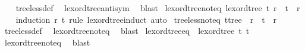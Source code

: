 \begin{isabellebody}
%
\isadelimproof
\ \ %
\endisadelimproof
%
\isatagproof
{}\isamarkupfalse%
\ tree{\isacharunderscore}{\kern0pt}less{\isacharunderscore}{\kern0pt}def\ \isamarkupfalse%
\ lexord{\isacharunderscore}{\kern0pt}tree{\isacharunderscore}{\kern0pt}antisym\ \isamarkupfalse%
\ blast%
\endisatagproof
{\isafoldproof}%
%
\isadelimproof
\isanewline
%
\endisadelimproof
\isanewline
{}\isamarkupfalse%
\ lexord{\isacharunderscore}{\kern0pt}tree{\isacharunderscore}{\kern0pt}not{\isacharunderscore}{\kern0pt}eq{\isacharcolon}{\kern0pt}\ {\isachardoublequoteopen}lexord{\isacharunderscore}{\kern0pt}tree\ t\ r\ {\isasymLongrightarrow}\ t\ {\isasymnoteq}\ r{\isachardoublequoteclose}\isanewline
%
\isadelimproof
\ \ %
\endisadelimproof
%
\isatagproof
{}\isamarkupfalse%
\ {\isacharparenleft}{\kern0pt}induction\ r\ t\ rule{\isacharcolon}{\kern0pt}\ lexord{\isacharunderscore}{\kern0pt}tree{\isachardot}{\kern0pt}induct{\isacharparenright}{\kern0pt}\ auto%
\endisatagproof
{\isafoldproof}%
%
\isadelimproof
\isanewline
%
\endisadelimproof
\isanewline
{}\isamarkupfalse%
\ tree{\isacharunderscore}{\kern0pt}less{\isacharunderscore}{\kern0pt}not{\isacharunderscore}{\kern0pt}eq{\isacharcolon}{\kern0pt}\ {\isachardoublequoteopen}{\isacharparenleft}{\kern0pt}t{\isacharcolon}{\kern0pt}{\isacharcolon}{\kern0pt}tree{\isacharparenright}{\kern0pt}\ {\isacharless}{\kern0pt}\ r\ {\isasymLongrightarrow}\ t\ {\isasymnoteq}\ r{\isachardoublequoteclose}\isanewline
%
\isadelimproof
\ \ %
\endisadelimproof
%
\isatagproof
{}\isamarkupfalse%
\ tree{\isacharunderscore}{\kern0pt}less{\isacharunderscore}{\kern0pt}def\ \isamarkupfalse%
\ lexord{\isacharunderscore}{\kern0pt}tree{\isacharunderscore}{\kern0pt}not{\isacharunderscore}{\kern0pt}eq\ \isamarkupfalse%
\ blast%
\endisatagproof
{\isafoldproof}%
%
\isadelimproof
\isanewline
%
\endisadelimproof
\isanewline
{}\isamarkupfalse%
\ lexord{\isacharunderscore}{\kern0pt}tree{\isacharunderscore}{\kern0pt}eq{\isacharcolon}{\kern0pt}\ {\isachardoublequoteopen}{\isasymnot}\ lexord{\isacharunderscore}{\kern0pt}tree\ t\ t{\isachardoublequoteclose}\isanewline
%
\isadelimproof
\ \ %
\endisadelimproof
%
\isatagproof
{}\isamarkupfalse%
\ lexord{\isacharunderscore}{\kern0pt}tree{\isacharunderscore}{\kern0pt}not{\isacharunderscore}{\kern0pt}eq\ \isamarkupfalse%
\ blast%
\endisatagproof
{\isafoldproof}%
%
\isadelimproof
\isanewline
%
\endisadelimproof
\isanewline
{}\isamarkupfalse%

\end{isabellebody}
